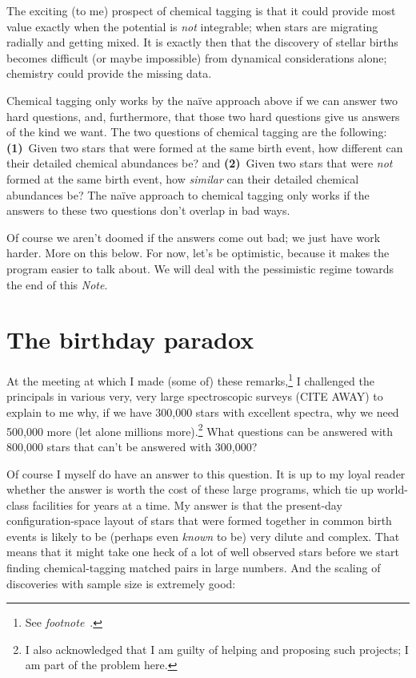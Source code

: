 \documentclass[11pt, letterpaper]{article}
\newcommand{\documentname}{\textsl{Note}}
\newcommand{\footnotename}[1]{\textsl{footnote}~\footnotemark[\ref{#1}]}
\begin{document}
The exciting (to me) prospect of chemical tagging is that it could
provide most value exactly when the potential is \emph{not}
integrable; when stars are migrating radially and getting mixed.
It is exactly then that the discovery of stellar births becomes
difficult (or maybe impossible) from dynamical considerations alone;
chemistry could provide the missing data.

Chemical tagging only works by the na\"ive approach above if we can
answer two hard questions, and, furthermore, that those two hard
questions give us answers of the kind we want. The two questions of
chemical tagging are the following: \textbf{(1)}~Given two stars that
were formed at the same birth event, how different can their detailed
chemical abundances be? and \textbf{(2)}~Given two stars that were
\emph{not} formed at the same birth event, how \emph{similar} can
their detailed chemical abundances be? The na\"ive approach to
chemical tagging only works if the answers to these two questions
don't overlap in bad ways.

Of course we aren't doomed if the answers come out bad; we just have
work harder. More on this below. For now, let's be optimistic, because
it makes the program easier to talk about. We will deal with the
pessimistic regime towards the end of this \documentname.

\section{The birthday paradox}

At the meeting at which I made (some of) these remarks,\footnote{See
  \footnotename{foot:conference}.} I challenged the principals in
various very, very large spectroscopic surveys (CITE AWAY) to explain
to me why, if we have 300,000 stars with excellent spectra, why we
need 500,000 more (let alone millions more).\footnote{I also
  acknowledged that I am guilty of helping and proposing such
  projects; I am part of the problem here.} What questions can be
answered with 800,000 stars that can't be answered with 300,000? 

Of course I myself do have an answer to this question. It is up to my
loyal reader whether the answer is worth the cost of these large
programs, which tie up world-class facilities for years at a time.  My
answer is that the present-day configuration-space layout of stars
that were formed together in common birth events is likely to be
(perhaps even \emph{known} to be) very dilute and complex. That means
that it might take one heck of a lot of well observed stars before we
start finding chemical-tagging matched pairs in large numbers. And the
scaling of discoveries with sample size is extremely good:
\end{document}

